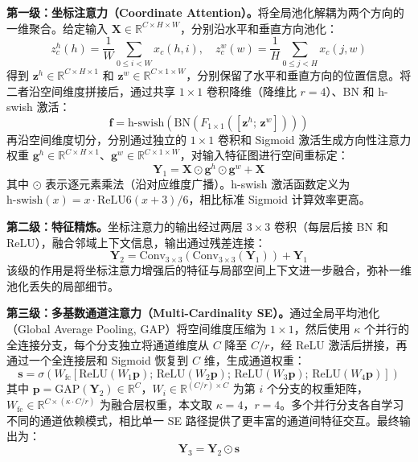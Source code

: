 \textbf{第一级：坐标注意力（Coordinate Attention）。}将全局池化解耦为两个方向的一维聚合。给定输入 $\mathbf{X} \in \mathbb{R}^{C \times H \times W}$，分别沿水平和垂直方向池化：
\begin{equation}
z_c^h(h) = \frac{1}{W}\sum_{0 \leq i < W} x_c(h, i), \quad z_c^w(w) = \frac{1}{H}\sum_{0 \leq j < H} x_c(j, w)
\end{equation}
得到 $\mathbf{z}^h \in \mathbb{R}^{C \times H \times 1}$ 和 $\mathbf{z}^w \in \mathbb{R}^{C \times 1 \times W}$，分别保留了水平和垂直方向的位置信息。将二者沿空间维度拼接后，通过共享 $1 \times 1$ 卷积降维（降维比 $r = 4$）、BN 和 h-swish 激活：
\begin{equation}
\mathbf{f} = \text{h-swish}\!\left(\text{BN}\!\left(F_{1 \times 1}([\mathbf{z}^h;\, \mathbf{z}^w])\right)\right)
\end{equation}
再沿空间维度切分，分别通过独立的 $1 \times 1$ 卷积和 Sigmoid 激活生成方向性注意力权重 $\mathbf{g}^h \in \mathbb{R}^{C \times H \times 1}$、$\mathbf{g}^w \in \mathbb{R}^{C \times 1 \times W}$，对输入特征图进行空间重标定：
\begin{equation}
\mathbf{Y}_1 = \mathbf{X} \odot \mathbf{g}^h \odot \mathbf{g}^w + \mathbf{X}
\end{equation}
其中 $\odot$ 表示逐元素乘法（沿对应维度广播）。h-swish 激活函数定义为 $\text{h-swish}(x) = x \cdot \text{ReLU6}(x+3)/6$，相比标准 Sigmoid 计算效率更高。

\textbf{第二级：特征精炼。}坐标注意力的输出经过两层 $3 \times 3$ 卷积（每层后接 BN 和 ReLU），融合邻域上下文信息，输出通过残差连接：
\begin{equation}
\mathbf{Y}_2 = \text{Conv}_{3 \times 3}\!\left(\text{Conv}_{3 \times 3}(\mathbf{Y}_1)\right) + \mathbf{Y}_1
\end{equation}
该级的作用是将坐标注意力增强后的特征与局部空间上下文进一步融合，弥补一维池化丢失的局部细节。

\textbf{第三级：多基数通道注意力（Multi-Cardinality SE）。}通过全局平均池化（Global Average Pooling, GAP）将空间维度压缩为 $1 \times 1$，然后使用 $\kappa$ 个并行的全连接分支，每个分支独立将通道维度从 $C$ 降至 $C/r$，经 ReLU 激活后拼接，再通过一个全连接层和 Sigmoid 恢复到 $C$ 维，生成通道权重：
\begin{equation}
\mathbf{s} = \sigma\!\left(W_{\text{fc}}\!\left[\text{ReLU}(W_1 \mathbf{p});\, \text{ReLU}(W_2 \mathbf{p});\, \text{ReLU}(W_3 \mathbf{p});\, \text{ReLU}(W_4 \mathbf{p})\right]\right)
\end{equation}
其中 $\mathbf{p} = \text{GAP}(\mathbf{Y}_2) \in \mathbb{R}^C$，$W_i \in \mathbb{R}^{(C/r) \times C}$ 为第 $i$ 个分支的权重矩阵，$W_{\text{fc}} \in \mathbb{R}^{C \times (\kappa \cdot C/r)}$ 为融合层权重，本文取 $\kappa = 4$，$r = 4$。多个并行分支各自学习不同的通道依赖模式，相比单一 SE 路径提供了更丰富的通道间特征交互。最终输出为：
\begin{equation}
\mathbf{Y}_3 = \mathbf{Y}_2 \odot \mathbf{s}
\end{equation}

